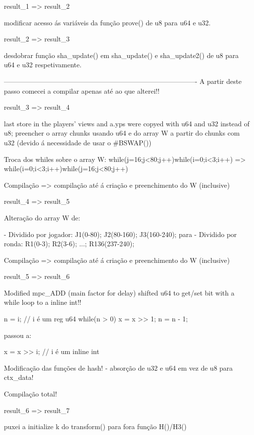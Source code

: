 result_1 => result_2

modificar acesso ás variáveis da função prove() de u8 para u64 e u32.


result_2 => result_3

desdobrar função sha_update() em sha_update() e sha_update2() de u8 para u64 e u32 respetivamente.


-------------------------------------------------------------------------------------
A partir deste passo comecei a compilar apenas até ao que alterei!!

result_3 => result_4

last store in the players' views and a.yps were copyed with u64 and u32 instead of u8;
preencher o array chunks usando u64 e  do array W a partir do chunks com u32 (devido á necessidade de usar o #BSWAP())

Troca dos whiles sobre o array W: 
while(j=16;j<80;j++){while(i=0;i<3;i++){}} => while(i=0;i<3;i++){while(j=16;j<80;j++){}}


Compilação => compilação até á criação e preenchimento do W (inclusive)

result_4 => result_5

Alteração do array W de:
	
	- Dividido por jogador: J1(0-80); J2(80-160); J3(160-240);
	 para
	- Dividido por ronda: R1(0-3); R2(3-6); ...; R136(237-240);


Compilação => compilação até á criação e preenchimento do W (inclusive)


result_5 => result_6



Modified mpc_ADD (main factor for delay) shifted u64 to get/set bit with a while loop to a inline int!!

	n = i;		     // i é um reg u64
	while(n > 0){
		x = x >> 1;
		n = n - 1;
	}

	passou a:

	x = x >> i;     // i é um inline int

Modificação das funções de hash! - absorção de u32 e u64  em vez de u8 para ctx_data!


Compilação total!


result_6 => result_7

puxei a initialize k do transform() para fora função H()/H3()




